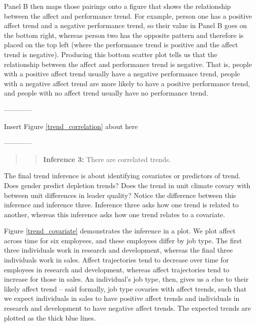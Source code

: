 \documentclass[english,,man]{apa6}
\theoremstyle{definition}
\theoremstyle{definition}
\theoremstyle{definition}
\theoremstyle{remark}
\begin{document}
Panel B then maps those pairings onto a figure that shows the
relationship between the affect and performance trend. For example,
person one has a positive affect trend and a negative performance trend,
so their value in Panel B goes on the bottom right, whereas person two
has the opposite pattern and therefore is placed on the top left (where
the performance trend is positive and the affect trend is negative).
Producing this bottom scatter plot tells us that the relationship
between the affect and performance trend is negative. That is, people
with a positive affect trend usually have a negative performance trend,
people with a negative affect trend are more likely to have a positive
performance trend, and people with no affect trend usually have no
performance trend.

\begin{center}

------------

Insert Figure \ref{trend_correlation} about here

------------

\end{center}

\begin{quote}
\begin{quote}
\textbf{Inference 3:} There are correlated trends.
\end{quote}
\end{quote}

The final trend inference is about identifying covariates or predictors
of trend. Does gender predict depletion trends? Does the trend in unit
climate covary with between unit differences in leader quality? Notice
the difference between this inference and inference three. Inference
three asks how one trend is related to another, whereas this inference
asks how one trend relates to a covariate.

Figure \ref{trend_covariate} demonstrates the inference in a plot. We
plot affect across time for six employees, and these employees differ by
job type. The first three individuals work in research and development,
whereas the final three individuals work in sales. Affect trajectories
tend to decrease over time for employees in research and development,
whereas affect trajectories tend to increase for those in sales. An
individual's job type, then, gives us a clue to their likely affect
trend -- said formally, job type covaries with affect trends, such that
we expect individuals in sales to have positive affect trends and
individuals in research and development to have negative affect trends.
The expected trends are plotted as the thick blue lines.
\end{document}
